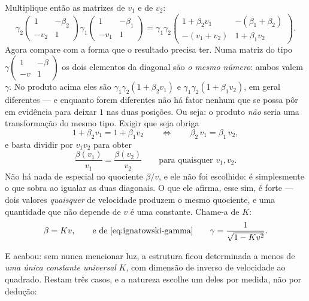 \documentclass[12pt,a4paper,oneside]{book}
\theoremstyle{rgplain}
\theoremstyle{rgremark}
\begin{document}
\begin{resultado}
Multiplique então as matrizes de $v_1$ e de $v_2$:
\[
  \gamma_2\begin{pmatrix}1&-\beta_2\\-v_2&1\end{pmatrix}
  \gamma_1\begin{pmatrix}1&-\beta_1\\-v_1&1\end{pmatrix}
  =\gamma_1\gamma_2
  \begin{pmatrix}
    1+\beta_2v_1 & -(\beta_1+\beta_2)\\[2pt]
    -(v_1+v_2) & 1+\beta_1v_2
  \end{pmatrix}.
\]
Agora compare com a forma que o resultado precisa ter. Numa matriz do tipo
$\gamma\left(\begin{smallmatrix}1&-\beta\\-v&1\end{smallmatrix}\right)$ os dois
elementos da diagonal são \emph{o mesmo número}: ambos valem $\gamma$. No
produto acima eles são $\gamma_1\gamma_2(1+\beta_2v_1)$ e
$\gamma_1\gamma_2(1+\beta_1v_2)$, em geral diferentes --- e enquanto forem
diferentes não há fator nenhum que se possa pôr em evidência para deixar
$1$ nas duas posições. Ou seja: o produto \emph{não} seria uma transformação do
mesmo tipo. Exigir que seja obriga
\[
  1+\beta_2v_1=1+\beta_1v_2
  \qquad\Longleftrightarrow\qquad
  \beta_2\,v_1=\beta_1\,v_2 ,
\]
e basta dividir por $v_1v_2$ para obter
\[
  \frac{\beta(v_1)}{v_1}=\frac{\beta(v_2)}{v_2}
  \qquad\text{para quaisquer } v_1,v_2 .
\]
Não há nada de especial no quociente $\beta/v$, e ele não foi escolhido: é
simplesmente o que sobra ao igualar as duas diagonais. O que ele afirma, esse
sim, é forte --- dois valores \emph{quaisquer} de velocidade produzem o mesmo
quociente, e uma quantidade que não depende de $v$ é uma constante. Chame-a de
$K$:
\[
  \beta=K v,
  \qquad\text{e de \eqref{eq:ignatowski-gamma}}\qquad
  \gamma=\frac{1}{\sqrt{1-Kv^2}} .
\]
\end{resultado}

E acabou: sem nunca mencionar luz, a estrutura ficou determinada a menos de
\emph{uma única constante universal} $K$, com dimensão de inverso de
velocidade ao quadrado. Restam três casos, e a natureza escolhe um deles por
medida, não por dedução:
\end{document}
